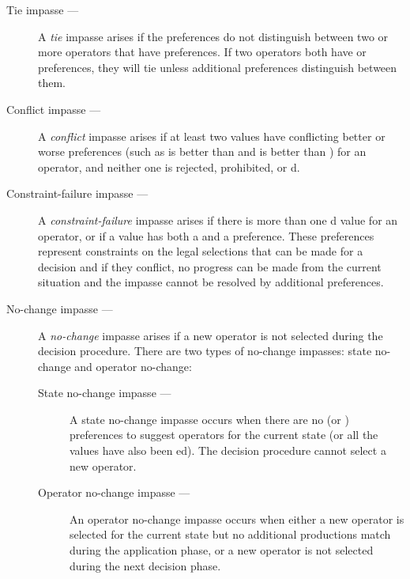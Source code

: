 \begin{description}
\item[Tie impasse ---]
	A \emph{tie} impasse arises if the preferences do not distinguish between two or more operators that have  preferences. If two operators both have  or  preferences, they will tie unless additional preferences distinguish between them.
	\vspace{-8pt}
\item[Conflict impasse ---]
	A \emph{conflict} impasse arises if at least two values have conflicting better or worse preferences (such as  is better than  and  is better than ) for an operator, and neither one is rejected, prohibited, or d.
	\vspace{-8pt}
\item[Constraint-failure impasse ---]
	A \emph{constraint-failure} impasse arises if there is more than one d value for an operator, or if a value has both a  and a  preference. These preferences represent constraints on the legal selections that can be made for a decision and if they conflict, no progress can be made from the current situation and the impasse cannot be resolved by additional preferences.
	\vspace{-8pt}
\item[No-change impasse ---]
	A \emph{no-change} impasse arises if a new operator is not selected during the decision procedure. There are two types of no-change impasses: state no-change and operator no-change:
	\vspace{-8pt}
	\begin{description}
		\item[State no-change impasse ---]
			A state no-change impasse occurs when there are no  (or ) preferences to suggest operators for the current state (or all the  values have also been ed). The decision procedure cannot select a new operator.\vspace{-8pt}
        \item[Operator no-change impasse ---]
	        An operator no-change impasse occurs when either a new operator is selected for the current state but no additional productions match during the application phase, or a new operator is not selected during the next decision phase.
	\end{description}
\end{description}

